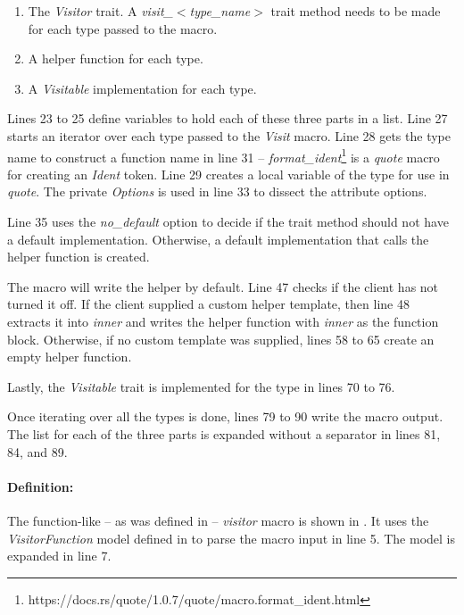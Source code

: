 \begin{enumerate}
	\item The \textit{Visitor} trait.
	      A \textit{visit\_$<$type\_name$>$} trait method needs to be made for each type passed to the macro.
	\item A helper function for each type.
	\item A \textit{Visitable} implementation for each type.
\end{enumerate}

Lines 23 to 25 define variables to hold each of these three parts in a list.
Line 27 starts an iterator over each type passed to the \textit{Visit} macro.
Line 28 gets the type name to construct a function name in line 31 -- \textit{format\_ident}\footnote{https://docs.rs/quote/1.0.7/quote/macro.format\_ident.html} is a \textit{quote} macro for creating an \textit{Ident} token.
Line 29 creates a local variable of the type for use in \textit{quote}.
The private \textit{Options} is used in line 33 to dissect the attribute options.

Line 35 uses the \textit{no\_default} option to decide if the trait method should not have a default implementation.
Otherwise, a default implementation that calls the helper function is created.

The macro will write the helper by default.
Line 47 checks if the client has not turned it off.
If the client supplied a custom helper template, then line 48 extracts it into \textit{inner} and writes the helper function with \textit{inner} as the function block.
Otherwise, if no custom template was supplied, lines 58 to 65 create an empty helper function.

Lastly, the \textit{Visitable} trait is implemented for the type in lines 70 to 76.

Once iterating over all the types is done, lines 79 to 90 write the macro output.
The list for each of the three parts is expanded without a separator in lines 81, 84, and 89.

\paragraph{Definition:}
The function-like -- as was defined in  -- \textit{visitor} macro is shown in .
It uses the \textit{VisitorFunction} model defined in  to parse the macro input in line 5.
The model is expanded in line 7.